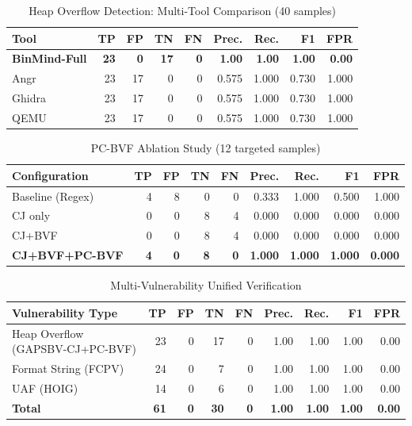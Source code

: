 \begin{table}[htbp]
\centering
\caption{Heap Overflow Detection: Multi-Tool Comparison (40 samples)}
\label{tab:heap-comparison}
\begin{tabular}{lrrrrrrrr}
\toprule
Tool & TP & FP & TN & FN & Prec. & Rec. & F1 & FPR \\
\midrule
\textbf{BinMind-Full} & \textbf{23} & \textbf{0} & \textbf{17} & \textbf{0} & \textbf{1.00} & \textbf{1.00} & \textbf{1.00} & \textbf{0.00} \\
Angr  & 23 & 17 & 0 & 0 & 0.575 & 1.000 & 0.730 & 1.000 \\
Ghidra & 23 & 17 & 0 & 0 & 0.575 & 1.000 & 0.730 & 1.000 \\
QEMU  & 23 & 17 & 0 & 0 & 0.575 & 1.000 & 0.730 & 1.000 \\
\bottomrule
\end{tabular}
\end{table}

\begin{table}[htbp]
\centering
\caption{PC-BVF Ablation Study (12 targeted samples)}
\label{tab:ablation}
\begin{tabular}{lrrrrrrrr}
\toprule
Configuration & TP & FP & TN & FN & Prec. & Rec. & F1 & FPR \\
\midrule
Baseline (Regex) & 4 & 8 & 0 & 0 & 0.333 & 1.000 & 0.500 & 1.000 \\
CJ only & 0 & 0 & 8 & 4 & 0.000 & 0.000 & 0.000 & 0.000 \\
CJ+BVF & 0 & 0 & 8 & 4 & 0.000 & 0.000 & 0.000 & 0.000 \\
\textbf{CJ+BVF+PC-BVF} & \textbf{4} & \textbf{0} & \textbf{8} & \textbf{0} & \textbf{1.000} & \textbf{1.000} & \textbf{1.000} & \textbf{0.000} \\
\bottomrule
\end{tabular}
\end{table}

\begin{table}[htbp]
\centering
\caption{Multi-Vulnerability Unified Verification}
\label{tab:multi-vuln}
\begin{tabular}{lrrrrrrrr}
\toprule
Vulnerability Type & TP & FP & TN & FN & Prec. & Rec. & F1 & FPR \\
\midrule
Heap Overflow (GAPSBV-CJ+PC-BVF) & 23 & 0 & 17 & 0 & 1.00 & 1.00 & 1.00 & 0.00 \\
Format String (FCPV) & 24 & 0 & 7 & 0 & 1.00 & 1.00 & 1.00 & 0.00 \\
UAF (HOIG) & 14 & 0 & 6 & 0 & 1.00 & 1.00 & 1.00 & 0.00 \\
\midrule
\textbf{Total} & \textbf{61} & \textbf{0} & \textbf{30} & \textbf{0} & \textbf{1.00} & \textbf{1.00} & \textbf{1.00} & \textbf{0.00} \\
\bottomrule
\end{tabular}
\end{table}
